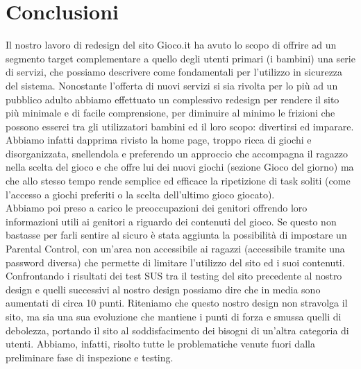 \documentclass[../Report.tex]{subfiles}
\begin{document}
    \chapter{Conclusioni}
    Il nostro lavoro di redesign del sito Gioco.it ha avuto lo scopo di offrire ad un segmento target complementare a quello degli utenti primari (i bambini) una serie di servizi, che possiamo descrivere come fondamentali per l'utilizzo in sicurezza del sistema. Nonostante l'offerta di nuovi servizi si sia rivolta per lo più ad un pubblico adulto abbiamo effettuato un complessivo redesign per rendere il sito più minimale e di facile comprensione, per diminuire al minimo le frizioni che possono esserci tra gli utilizzatori bambini ed il loro scopo: divertirsi ed imparare. \\
    Abbiamo infatti dapprima rivisto la home page, troppo ricca di giochi e disorganizzata, snellendola e preferendo un approccio che accompagna il ragazzo nella scelta del gioco e che offre lui dei nuovi giochi (sezione Gioco del giorno) ma che allo stesso tempo rende semplice ed efficace la ripetizione di task soliti (come l'accesso a giochi preferiti o la scelta dell'ultimo gioco giocato).\\
    Abbiamo poi preso a carico le preoccupazioni dei genitori offrendo loro informazioni utili ai genitori a riguardo dei contenuti del gioco. Se questo non bastasse per farli sentire al sicuro è stata aggiunta la possibilità di impostare un Parental Control, con un'area non accessibile ai ragazzi (accessibile tramite una password diversa) che permette di limitare l'utilizzo del sito ed i suoi contenuti.\\
    Confrontando i risultati dei test SUS tra il testing del sito precedente al nostro design e quelli successivi al nostro design possiamo dire che in media sono aumentati di circa 10 punti.
    Riteniamo che questo nostro design non stravolga il sito, ma sia una sua evoluzione che mantiene i punti di forza e smussa quelli di debolezza, portando il sito al soddisfacimento dei bisogni di un'altra categoria di utenti. Abbiamo, infatti, risolto tutte le problematiche venute fuori dalla preliminare fase di inspezione e testing. 
\end{document}
